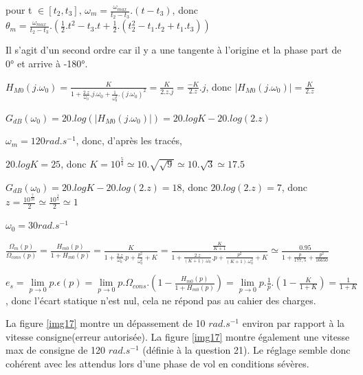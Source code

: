 pour t $\in[t_2,t_3]$, $\omega_m=\frac{\omega_{max}}{t_2-t_3}.(t-t_3)$, donc 
$\theta_m=\frac{\omega_{max}}{t_2-t_3}.\left(\frac{1}{2}.t^2-t_3.t+\frac{1}{2}.\left(t_2^2-t_1.t_2+t_1.t_3\right)\right)$

\cor

Il s'agit d'un second ordre car il y a une tangente à l'origine et la phase part de 0° et arrive à -180°.

\cor

$H_{M0}(j.\omega_0)=\frac{K}{1+\frac{2.z}{\omega_0}.j.\omega_0+\frac{1}{\omega_0^2}.(j.\omega_0)^2}=\frac{K}{2.z.j}=\frac{-K}{2.z}.j$, donc $|H_{M0}(j.\omega_0)|=\frac{K}{2.z}$

\cor

$G_{dB}(\omega_0)=20.log(|H_{M0}(j.\omega_0)|)=20.logK-20.log(2.z)$

\cor

$\omega_m=120rad.s^{-1}$, donc, d'après les tracés,

$20.logK=25$, donc $K=10^{\frac{5}{4}}\simeq10.\sqrt{\sqrt{9}}\simeq10.\sqrt{3}\simeq17.5$

$G_{dB}(\omega_0)=20.logK-20.log(2.z)=18$, donc $20.log(2.z)=7$, donc $z=\frac{10^{\frac{7}{20}}}{2}\simeq\frac{10^{\frac{1}{3}}}{2} \simeq 1$

$\omega_0=30rad.s^{-1}$

\cor

$\frac{\Omega_m(p)}{\Omega_{cons}(p)}=\frac{H_{m0}(p)}{1+H_{m0}(p)}=\frac{K}{1+\frac{2.z}{\omega_0}.p+\frac{p^2}{\omega_0^2}+K}=\frac{\frac{K}{K+1}}{1+\frac{2.z}{(K+1).\omega_0}.p+\frac{p^2}{(K+1).\omega_0^2}+K}\simeq \frac{0.95}{1+\frac{p}{177,5}+\frac{p^2}{16650}}$

\cor

$e_s=\lim\limits_{p\to 0}p.\epsilon(p)=\lim\limits_{p\to 0}p.\Omega_{cons}.\left(1-\frac{H_{m0}(p)}{1+H_{m0}(p)}\right)=\lim\limits_{p\to 0}p.\frac{1}{p}.\left(1-\frac{K}{1+K}\right)=\frac{1}{1+K}$, donc l'écart statique n'est nul, cela ne répond pas au cahier des charges.

\cor

La figure \ref{img17} montre un dépassement de 10 $rad.s^{-1}$ environ par rapport à la vitesse consigne(erreur autorisée). La figure \ref{img17} montre également une vitesse max de consigne de 120 $rad.s^{-1}$ (définie à la question 21). Le réglage semble donc cohérent avec les attendus lors d'une phase de vol en conditions sévères.

\newpage

\cor

